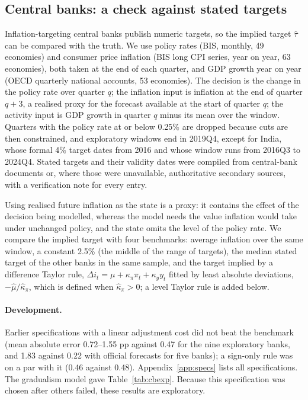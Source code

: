\documentclass[pdflatex,sn-basic]{sn-jnl}
\theoremstyle{thmstyleone}\newtheorem{proposition}{Proposition}\newtheorem{theorem}{Theorem}
\theoremstyle{thmstylethree}\newtheorem{remark}{Remark}
\begin{document}
\subsection{Central banks: a check against stated targets}\label{sec:cb}
Inflation-targeting central banks publish numeric targets, so the implied target $\hat\tau$ can be compared with the truth. We use policy rates (BIS, monthly, 49 economies) and consumer price inflation (BIS long CPI series, year on year, 63 economies), both taken at the end of each quarter, and GDP growth year on year (OECD quarterly national accounts, 53 economies). The decision is the change in the policy rate over quarter $q$; the inflation input is inflation at the end of quarter $q+3$, a realised proxy for the forecast available at the start of quarter $q$; the activity input is GDP growth in quarter $q$ minus its mean over the window. Quarters with the policy rate at or below 0.25\% are dropped because cuts are then constrained, and exploratory windows end in 2019Q4, except for India, whose formal 4\% target dates from 2016 and whose window runs from 2016Q3 to 2024Q4. Stated targets and their validity dates were compiled from central-bank documents or, where those were unavailable, authoritative secondary sources, with a verification note for every entry.

Using realised future inflation as the state is a proxy: it contains the effect of the decision being modelled, whereas the model needs the value inflation would take under unchanged policy, and the state omits the level of the policy rate. We compare the implied target with four benchmarks: average inflation over the same window, a constant 2.5\% (the middle of the range of targets), the median stated target of the other banks in the same sample, and the target implied by a difference Taylor rule, $\Delta i_t=\mu+\kappa_\pi\pi_t+\kappa_yy_t$ fitted by least absolute deviations, $-\hat\mu/\hat\kappa_\pi$, which is defined when $\hat\kappa_\pi>0$; a level Taylor rule is added below.

\paragraph{Development.} Earlier specifications with a linear adjustment cost did not beat the benchmark (mean absolute error 0.72--1.55 pp against 0.47 for the nine exploratory banks, and 1.83 against 0.22 with official forecasts for five banks); a sign-only rule was on a par with it (0.46 against 0.48). Appendix~\ref{app:specs} lists all specifications. The gradualism model gave Table~\ref{tab:cbexp}. Because this specification was chosen after others failed, these results are exploratory.
\begin{table}[t]\centering\small
\caption{Exploratory banks (gradualism model, realised inputs).}\label{tab:cbexp}\end{table}
\end{document}
